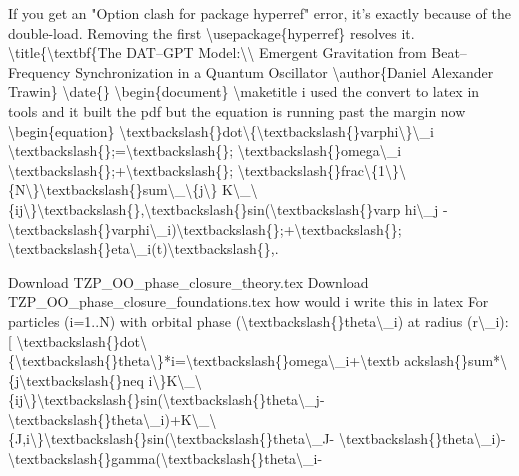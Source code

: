 If you get an "Option clash for package hyperref" error, it's exactly because of the double-load. Removing the first \textbackslash{}usepackage\{hyperref\} resolves it. \textbackslash{}title\{\textbackslash{}textbf\{The DAT--GPT Model:\textbackslash{}\textbackslash{} Emergent Gravitation from Beat--Frequency Synchronization in a Quantum Oscillator \textbackslash{}author\{Daniel Alexander Trawin\} \textbackslash{}date\{\} \textbackslash{}begin\{document\} \textbackslash{}maketitle i used the convert to latex in tools and it built the pdf but the equation is running past the margin now \textbackslash{}begin\{equation\} \textbackslash{}textbackslash\{\}dot\textbackslash{}\{\textbackslash{}textbackslash\{\}varphi\textbackslash{}\}\textbackslash{}\_i \textbackslash{}textbackslash\{\};=\textbackslash{}textbackslash\{\}; \textbackslash{}textbackslash\{\}omega\textbackslash{}\_i \textbackslash{}textbackslash\{\};+\textbackslash{}textbackslash\{\}; \textbackslash{}textbackslash\{\}frac\textbackslash{}\{1\textbackslash{}\}\textbackslash{} \{N\textbackslash{}\}\textbackslash{}textbackslash\{\}sum\textbackslash{}\_\textbackslash{}\{j\textbackslash{}\} K\textbackslash{}\_\textbackslash{} \{ij\textbackslash{}\}\textbackslash{}textbackslash\{\},\textbackslash{}textbackslash\{\}sin(\textbackslash{}textbackslash\{\}varp hi\textbackslash{}\_j - \textbackslash{}textbackslash\{\}varphi\textbackslash{}\_i)\textbackslash{}textbackslash\{\};+\textbackslash{}textbackslash\{\}; \textbackslash{}textbackslash\{\}eta\textbackslash{}\_i(t)\textbackslash{}textbackslash\{\},.

Download TZP\_OO\_phase\_closure\_theory.tex Download TZP\_OO\_phase\_closure\_foundations.tex how would i write this in latex For particles (i=1..N) with orbital phase (\textbackslash{}textbackslash\{\}theta\textbackslash{}\_i) at radius (r\textbackslash{}\_i): [ \textbackslash{}textbackslash\{\}dot\textbackslash{} \{\textbackslash{}textbackslash\{\}theta\textbackslash{}\}*i=\textbackslash{}textbackslash\{\}omega\textbackslash{}\_i+\textbackslash{}textb ackslash\{\}sum*\textbackslash{}\{j\textbackslash{}textbackslash\{\}neq i\textbackslash{}\}K\textbackslash{}\_\textbackslash{} \{ij\textbackslash{}\}\textbackslash{}textbackslash\{\}sin(\textbackslash{}textbackslash\{\}theta\textbackslash{}\_j- \textbackslash{}textbackslash\{\}theta\textbackslash{}\_i)+K\textbackslash{}\_\textbackslash{} \{J,i\textbackslash{}\}\textbackslash{}textbackslash\{\}sin(\textbackslash{}textbackslash\{\}theta\textbackslash{}\_J- \textbackslash{}textbackslash\{\}theta\textbackslash{}\_i)- \textbackslash{}textbackslash\{\}gamma(\textbackslash{}textbackslash\{\}theta\textbackslash{}\_i-
\endgroup

